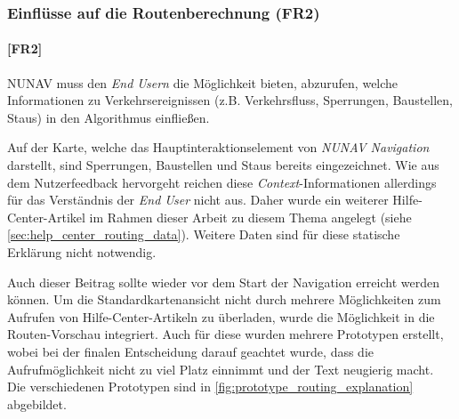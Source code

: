 \subsubsection{Einflüsse auf die Routenberechnung (FR2)}
\label{sec:route_explanation_definition}

\paragraph{[FR2]} NUNAV muss den \textit{End Usern} die Möglichkeit bieten, abzurufen, welche Informationen zu Verkehrsereignissen (z.B. Verkehrsfluss, Sperrungen, Baustellen, Staus) in den Algorithmus einfließen.

\bigskip

Auf der Karte, welche das Hauptinteraktionselement von \textit{NUNAV Navigation} darstellt, sind Sperrungen, Baustellen und Staus bereits eingezeichnet. Wie aus dem Nutzerfeedback hervorgeht reichen diese \textit{Context}-Informationen allerdings für das Verständnis der \textit{End User} nicht aus. Daher wurde ein weiterer Hilfe-Center-Artikel im Rahmen dieser Arbeit zu diesem Thema angelegt (siehe \autoref{sec:help_center_routing_data}). Weitere Daten sind für diese statische Erklärung nicht notwendig.

Auch dieser Beitrag sollte wieder vor dem Start der Navigation erreicht werden können. Um die Standardkartenansicht nicht durch mehrere Möglichkeiten zum Aufrufen von Hilfe-Center-Artikeln zu überladen, wurde die Möglichkeit in die Routen-Vorschau integriert. Auch für diese wurden mehrere Prototypen erstellt, wobei bei der finalen Entscheidung darauf geachtet wurde, dass die Aufrufmöglichkeit nicht zu viel Platz einnimmt und der Text neugierig macht. Die verschiedenen Prototypen sind in \autoref{fig:prototype_routing_explanation} abgebildet.

